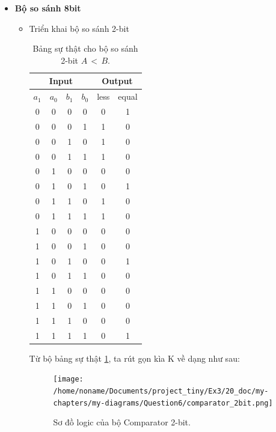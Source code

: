 \begin{itemize}[label=-]
	\item \textbf{Bộ so sánh 8bit}
	
	\begin{itemize}[label=+]
		\item Triển khai bộ so sánh 2-bit
		
		\begin{table}[H]
			\centering
			\begin{tabular}{|c|c|c|c|c|c|}
				\hline 
				\multicolumn{4}{|c|}{Input} & \multicolumn{2}{c|}{Output}\\
				\hline
				$ a_{1} $ & $ a_{0} $ & $ b_{1} $ & $ b_{0} $ & less & equal \\
				\hline
				0 & 0 & 0 & 0 & 0 & 1\\
				\hline
				0 & 0 & 0 & 1 & 1 & 0\\
				\hline
				0 & 0 & 1 & 0 & 1 & 0\\
				\hline
				0 & 0 & 1 & 1 & 1 & 0\\
				\hline
				0 & 1 & 0 & 0 & 0 & 0\\
				\hline
				0 & 1 & 0 & 1 & 0 & 1\\
				\hline
				0 & 1 & 1 & 0 & 1 & 0\\
				\hline
				0 & 1 & 1 & 1 & 1 & 0\\
				\hline
				1 & 0 & 0 & 0 & 0 & 0\\
				\hline
				1 & 0 & 0 & 1 & 0 & 0\\
				\hline
				1 & 0 & 1 & 0 & 0 & 1\\
				\hline
				1 & 0 & 1 & 1 & 0 & 0\\
				\hline
				1 & 1 & 0 & 0 & 0 & 0\\
				\hline
				1 & 1 & 0 & 1 & 0 & 0\\
				\hline
				1 & 1 & 1 & 0 & 0 & 0\\
				\hline
				1 & 1 & 1 & 1 & 0 & 1\\
				\hline
			\end{tabular}
			\caption{Bảng sự thật cho bộ so sánh 2-bit $ A \,<\, B $.}
			\label{tab: comparator 2bit}
		\end{table}
	
		Từ bộ bảng sự thật \ref{tab: comparator 2bit}, ta rút gọn kìa K về dạng như sau:
		
		\begin{figure}[H]
			\centering
			\texttt{[image: /home/noname/Documents/project\_tiny/Ex3/20\_doc/my-chapters/my-diagrams/Question6/comparator\_2bit.png]}
			\caption{Sơ đồ logic của bộ Comparator 2-bit.}
		\end{figure}
	

\end{itemize}
\end{itemize}
